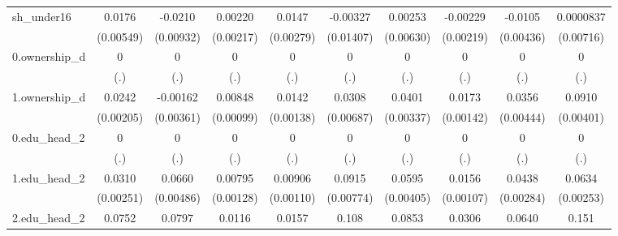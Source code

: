 \begin{table}[htbp]
\begin{tabular}{l*{9}{c}}
sh\_under16  &      0.0176\sym{***}&     -0.0210\sym{**} &     0.00220         &      0.0147\sym{***}&    -0.00327         &     0.00253         &    -0.00229         &     -0.0105\sym{**} &   0.0000837         \\
            &   (0.00549)         &   (0.00932)         &   (0.00217)         &   (0.00279)         &   (0.01407)         &   (0.00630)         &   (0.00219)         &   (0.00436)         &   (0.00716)         \\
0.ownership\_d&           0         &           0         &           0         &           0         &           0         &           0         &           0         &           0         &           0         \\
            &         (.)         &         (.)         &         (.)         &         (.)         &         (.)         &         (.)         &         (.)         &         (.)         &         (.)         \\
1.ownership\_d&      0.0242\sym{***}&    -0.00162         &     0.00848\sym{***}&      0.0142\sym{***}&      0.0308\sym{***}&      0.0401\sym{***}&      0.0173\sym{***}&      0.0356\sym{***}&      0.0910\sym{***}\\
            &   (0.00205)         &   (0.00361)         &   (0.00099)         &   (0.00138)         &   (0.00687)         &   (0.00337)         &   (0.00142)         &   (0.00444)         &   (0.00401)         \\
0.edu\_head\_2&           0         &           0         &           0         &           0         &           0         &           0         &           0         &           0         &           0         \\
            &         (.)         &         (.)         &         (.)         &         (.)         &         (.)         &         (.)         &         (.)         &         (.)         &         (.)         \\
1.edu\_head\_2&      0.0310\sym{***}&      0.0660\sym{***}&     0.00795\sym{***}&     0.00906\sym{***}&      0.0915\sym{***}&      0.0595\sym{***}&      0.0156\sym{***}&      0.0438\sym{***}&      0.0634\sym{***}\\
            &   (0.00251)         &   (0.00486)         &   (0.00128)         &   (0.00110)         &   (0.00774)         &   (0.00405)         &   (0.00107)         &   (0.00284)         &   (0.00253)         \\
2.edu\_head\_2&      0.0752\sym{***}&      0.0797\sym{***}&      0.0116\sym{***}&      0.0157\sym{***}&       0.108\sym{***}&      0.0853\sym{***}&      0.0306\sym{***}&      0.0640\sym{***}&       0.151\sym{***}\\

\end{tabular}
\end{table}
